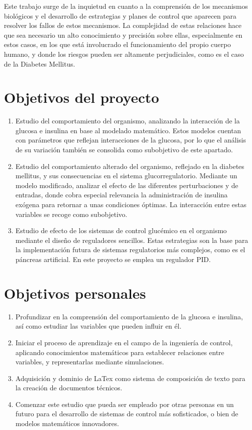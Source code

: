 
Este trabajo surge de la inquietud en cuanto a la comprensión de los mecanismos biológicos y el desarrollo de estrategias y planes de control que aparecen para resolver los fallos de estos mecanismos. La complejidad de estas relaciones hace que sea necesario un alto conocimiento y precisión sobre ellas, especialmente en estos casos, en los que está involucrado el funcionamiento del propio cuerpo humano, y donde los riesgos pueden ser altamente perjudiciales, como es el caso de la Diabetes Mellitus.

\section{Objetivos del proyecto}

\begin{enumerate}
    \item Estudio del comportamiento del organismo, analizando la interacción de la glucosa e insulina en base al modelado matemático. Estos modelos cuentan con parámetros que reflejan interacciones de la glucosa, por lo que el análisis de su variación también se consolida como subobjetivo de este apartado.
    \item Estudio del comportamiento alterado del organismo, reflejado en la diabetes mellitus, y sus consecuencias en el sistema glucorregulatorio. Mediante un modelo modificado, analizar el efecto de las diferentes perturbaciones y de entradas, donde cobra especial relevancia la administración de insulina exógena para retornar a unas condiciones óptimas. La interacción entre estas variables se recoge como subobjetivo.
    \item Estudio de efecto de los sistemas de control glucémico en el organismo mediante el diseño de reguladores sencillos. Estas estrategias son la base para la implementación futura de sistemas regulatorios más complejos, como es el páncreas artificial. En este proyecto se emplea un regulador PID.
\end{enumerate}

\section{Objetivos personales}

\begin{enumerate}
    \item Profundizar en la comprensión del comportamiento de la glucosa e insulina, así como estudiar las variables que pueden influir en él.
    \item Iniciar el proceso de aprendizaje en el campo de la ingeniería de control, aplicando conocimientos matemáticos para establecer relaciones entre variables, y representarlas mediante simulaciones.
    \item Adquisición y dominio de LaTex como sistema de composición de texto para la creación de documentos técnicos.
    \item Comenzar este estudio que pueda ser empleado por otras personas en un futuro para el desarrollo de sistemas de control más sofisticados, o bien de modelos matemáticos innovadores.
\end{enumerate}


